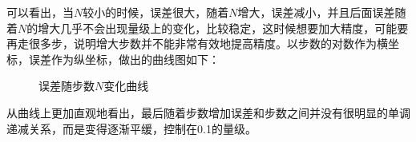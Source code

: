 \documentclass[UTF8]{ctexart}
\begin{document}

	\begin{flushleft}
		可以看出，当$N$较小的时候，误差很大，随着$N$增大，误差减小，并且后面误差随着$N$的增大几乎不会出现量级上的变化，比较稳定，这时候想要加大精度，可能要再走很多步，说明增大步数并不能非常有效地提高精度。以步数的对数作为横坐标，误差作为纵坐标，做出的曲线图如下：
		
		\begin{figure}[H]
					\centering  %
					\caption{误差随步数$N$变化曲线}
				\end{figure}
	从曲线上更加直观地看出，最后随着步数增加误差和步数之间并没有很明显的单调递减关系，而是变得逐渐平缓，控制在0.1的量级。
	
	\end{flushleft}
\end{document}
